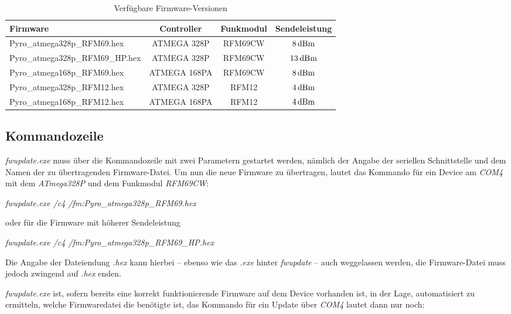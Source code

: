 \documentclass[pdftex, parskip, numbers=noenddot, toc=listof]{scrbook}
\begin{document}
			\begin{table}
				\centering
				\begin{tabularx}{.925\textwidth}{Xccc}
					\hline\hline
					Firmware                        & Controller   & Funkmodul & Sendeleistung    \\ \hline
					Pyro\_atmega328p\_RFM69.hex     & ATMEGA 328P  & RFM69CW   & $\unit[8]{dBm}$  \\
					Pyro\_atmega328p\_RFM69\_HP.hex & ATMEGA 328P  & RFM69CW   & $\unit[13]{dBm}$ \\
					Pyro\_atmega168p\_RFM69.hex     & ATMEGA 168PA & RFM69CW   & $\unit[8]{dBm}$  \\
					Pyro\_atmega328p\_RFM12.hex     & ATMEGA 328P  & RFM12     & $\unit[4]{dBm}$  \\
					Pyro\_atmega168p\_RFM12.hex     & ATMEGA 168PA & RFM12     & $\unit[4]{dBm}$  \\ \hline\hline
				\end{tabularx}
				\caption{Verfügbare Firmware-Versionen}
				\label{tab:firmwareversions}
			\end{table}

			\subsection{Kommandozeile}

				\emph{fwupdate.exe} muss über die Kommandozeile mit zwei Parametern gestartet werden, nämlich der Angabe der seriellen Schnittstelle und dem Namen der zu übertragenden Firmware-Datei. Um nun die neue Firmware zu übertragen, lautet das Kommando für ein Device am \emph{COM4} mit dem \emph{ATmega328P} und dem Funkmodul \emph{RFM69CW}:

				\begin{center}
					\emph{fwupdate.exe /c4 /fm:Pyro\_atmega328p\_RFM69.hex}
				\end{center}

				oder für die Firmware mit höherer Sendeleistung

				\begin{center}
					\emph{fwupdate.exe /c4 /fm:Pyro\_atmega328p\_RFM69\_HP.hex}
				\end{center}

				Die Angabe der Dateiendung \emph{.hex} kann hierbei -- ebenso wie das \emph{.exe} hinter \emph{fwupdate} -- auch weggelassen werden, die Firmware-Datei muss jedoch zwingend auf \emph{.hex} enden.

				\emph{fwupdate.exe} ist, sofern bereits eine korrekt funktionierende Firmware auf dem Device vorhanden ist, in der Lage, automatisiert zu ermitteln, welche Firmwaredatei die benötigte ist, das Kommando für ein Update über \emph{COM4} lautet dann nur noch:
\end{document}
